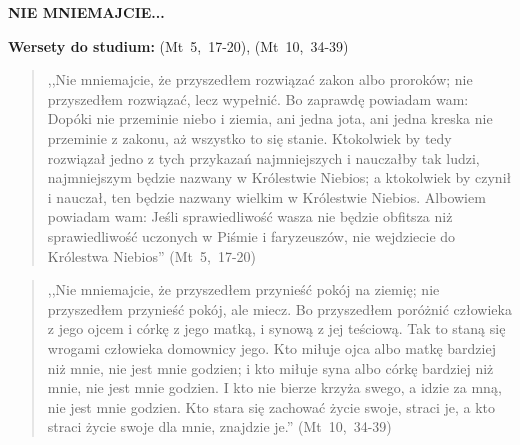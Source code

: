 \documentclass[10pt,a4paper,oneside]{article}
\begin{document}
\centerline{\textbf{\MakeUppercase{Nie mniemajcie...}}}
\begin{center}
\textbf{Wersety do studium:} \mbox{(Mt 5, 17-20)}, \mbox{(Mt 10, 34-39)}
\end{center}
\begin{quote}
,,Nie mniemajcie, że przyszedłem rozwiązać zakon albo proroków; nie przyszedłem rozwiązać, lecz wypełnić. Bo zaprawdę powiadam wam: Dopóki nie przeminie niebo i ziemia, ani jedna jota, ani jedna kreska nie przeminie z zakonu, aż wszystko to się stanie. Ktokolwiek by tedy rozwiązał jedno z tych przykazań najmniejszych i nauczałby tak ludzi, najmniejszym będzie nazwany w Królestwie Niebios; a ktokolwiek by czynił i nauczał, ten będzie nazwany wielkim w Królestwie Niebios. Albowiem powiadam wam: Jeśli sprawiedliwość wasza nie będzie obfitsza niż sprawiedliwość uczonych w Piśmie i faryzeuszów, nie wejdziecie do Królestwa Niebios'' \mbox{(Mt 5, 17-20)}
\end{quote}
\begin{quote}
,,Nie mniemajcie, że przyszedłem przynieść pokój na ziemię; nie przyszedłem przynieść pokój, ale miecz. Bo przyszedłem poróżnić człowieka z jego ojcem i córkę z jego matką, i synową z jej teściową. Tak to staną się wrogami człowieka domownicy jego. Kto miłuje ojca albo matkę bardziej niż mnie, nie jest mnie godzien; i kto miłuje syna albo córkę bardziej niż mnie, nie jest mnie godzien. I kto nie bierze krzyża swego, a idzie za mną, nie jest mnie godzien. Kto stara się zachować życie swoje, straci je, a kto straci życie swoje dla mnie, znajdzie je.'' \mbox{(Mt 10, 34-39)}
\end{quote}
\end{document}
